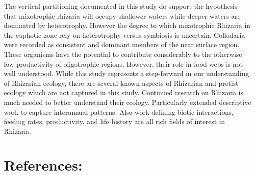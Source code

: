 \documentclass[
]{article}
\begin{document}
The vertical partitioning documented in this study do support the
hypothesis that mixotrophic rhizaria will occupy shallower waters while
deeper waters are dominated by heterotrophy. However the degree to which
mixotrophic Rhizaria in the euphotic zone rely on heterotrophy versus
symbiosis is uncertain. Collodaria were recorded as consistent and
dominant members of the near surface region. These organisms have the
potential to contribute considerably to the otherwise low productivity
of oligotrophic regions. However, their role in food webs is not well
understood. While this study represents a step-forward in our
understanding of Rhizarian ecology, there are several known aspects of
Rhizarian and protist ecology which are not captured in this study.
Continued research on Rhizaria is much needed to better understand their
ecology. Particularly extended descriptive work to capture interannual
patterns. Also work defining biotic interactions, feeding rates,
productivity, and life history are all rich fields of interest in
Rhizaria.

\hypertarget{references}{%
\section{References:}\label{references}}
\end{document}

